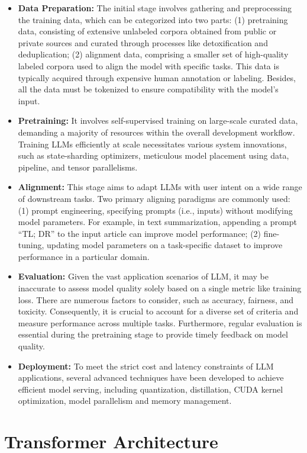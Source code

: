 \begin{itemize}
    \item \textbf{Data Preparation:} The initial stage involves gathering and preprocessing the training data, which can be categorized into two parts: (1) pretraining data, consisting of extensive unlabeled corpora obtained from public or private sources and curated through processes like detoxification and deduplication; (2) alignment data, comprising a smaller set of high-quality labeled corpora used to align the model with specific tasks. This data is typically acquired through expensive human annotation or labeling. Besides, all the data must be tokenized to ensure compatibility with the model's input.
    \item \textbf{Pretraining:} It involves self-supervised training on large-scale curated data, demanding a majority of resources within the overall development workflow. Training LLMs efficiently at scale necessitates various system innovations, such as state-sharding optimizers, meticulous model placement using data, pipeline, and tensor parallelisms.
    \item \textbf{Alignment:} This stage aims to adapt LLMs with user intent on a wide range of downstream tasks. Two primary aligning paradigms are commonly used: (1) prompt engineering, specifying prompts (i.e., inputs) without modifying model parameters. For example, in text summarization, appending a prompt “TL; DR” to the input article can improve model performance; (2) fine-tuning, updating model parameters on a task-specific dataset to improve performance in a particular domain.
    \item \textbf{Evaluation:} Given the vast application scenarios of LLM, it may be inaccurate to assess model quality solely based on a single metric like training loss. There are numerous factors to consider, such as accuracy, fairness, and toxicity. Consequently, it is crucial to account for a diverse set of criteria and measure performance across multiple tasks. Furthermore, regular evaluation is essential during the pretraining stage to provide timely feedback on model quality.
    \item \textbf{Deployment:} To meet the strict cost and latency constraints of LLM applications, several advanced techniques have been developed to achieve efficient model serving, including quantization, distillation, CUDA kernel optimization, model parallelism and memory management.
\end{itemize}


\section{Transformer Architecture}
